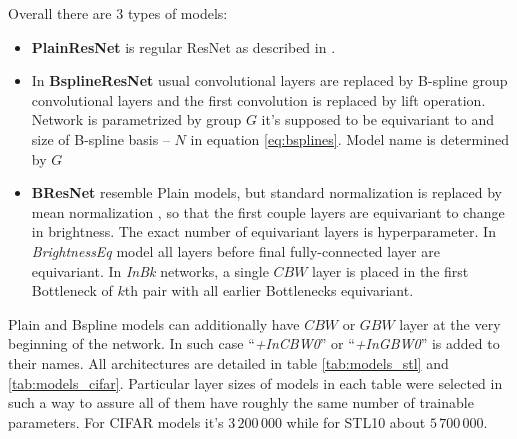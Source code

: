 Overall there are 3 types of models:
\begin{itemize}
    \item \textbf{PlainResNet} is regular ResNet as described in \cite{resnet}.
    \item In \textbf{BsplineResNet} usual convolutional layers are replaced by
        B-spline group convolutional layers and the first convolution is replaced
        by lift operation. Network is parametrized by group $G$ it's supposed to be
        equivariant to and size of B-spline basis -- $N$ in equation
        \ref{eq:bsplines}. Model name is determined by $G$
    \item \textbf{BResNet} resemble Plain models, but standard normalization is
        replaced by mean normalization , so that the first couple layers are
        equivariant to change in brightness. The exact number of equivariant
        layers is hyperparameter. In \textit{BrightnessEq} model all layers before
        final fully-connected layer are equivariant. In \textit{InBk} networks,
        a single $\mathit{CBW}$ layer is placed in the first Bottleneck of $k$th pair
        with all earlier Bottlenecks equivariant.
\end{itemize}
Plain and Bspline models can additionally have $\mathit{CBW}$ or $\mathit{GBW}$
layer at the very beginning of the network. In such case ``\textit{+InCBW0}'' or
``\textit{+InGBW0}'' is added to their names. All architectures are detailed in
table \ref{tab:models_stl} and \ref{tab:models_cifar}. Particular layer sizes of
models in each table were selected in such a way to assure all of them have
roughly the same number of trainable parameters. For CIFAR models it's
$3\,200\,000$ while for STL10 about $5\,700\,000$.

